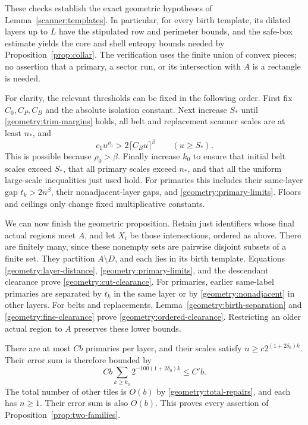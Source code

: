 These checks establish the exact geometric hypotheses of
Lemma~\ref{scanner:templates}.  In particular, for every birth template,
its dilated layers up to $L$ have the stipulated row and perimeter
bounds, and the safe-box estimate yields the core and shell entropy
bounds needed by Proposition~\ref{prop:collar}.  The verification uses
the finite union of convex pieces; no assertion that a primary, a sector
run, or its intersection with $A$ is a rectangle is needed.

For clarity, the relevant thresholds can be fixed in the following
order.  First fix $C_0,C_P,C_B$ and the absolute isolation constant.
Next increase $S_*$ until \eqref{geometry:trim-margins} holds, all belt and
replacement scanner scales are at least $n_*$, and
\begin{equation}
\label{geometry:fine-clearance}
 c_1u^{\rho_0}>2\lceil C_Bu\rceil^\beta
 \qquad(u\ge S_*).
\end{equation}
This is possible because $\rho_0>\beta$.  Finally increase $k_0$ to
ensure that initial belt scales exceed $S_*$, that all primary scales
exceed $n_*$, and that all the uniform large-scale inequalities just used
hold.  For primaries this includes their same-layer gap
$t_k>2n^\beta$, their nonadjacent-layer gaps, and
\eqref{geometry:primary-limits}.  Floors and ceilings only change fixed
multiplicative constants.

We can now finish the geometric proposition.  Retain just identifiers
whose final actual regions meet $A$, and let $X_i$ be those intersections,
ordered as above.  There are finitely many, since these nonempty sets
are pairwise disjoint subsets of a finite set.  They partition $A\setminus
D$, and each lies in its birth template.  Equations
\eqref{geometry:layer-distance}, \eqref{geometry:primary-limits}, and the
descendant clearance prove \eqref{geometry:cut-clearance}.
For primaries, earlier same-label primaries are separated by $t_k$ in the
same layer or by \eqref{geometry:nonadjacent} in other layers.  For belts
and replacements, Lemma~\ref{geometry:birth-separation} and
\eqref{geometry:fine-clearance} prove
\eqref{geometry:ordered-clearance}.  Restricting an older actual region
to $A$ preserves these lower bounds.

There are at most $Cb$ primaries per layer, and their scales satisfy
$n\ge c2^{(1+2\delta_0)k}$.  Their error sum is therefore bounded by
\[
 Cb\sum_{k\ge k_0}2^{-100(1+2\delta_0)k}\le C'b.
\]
The total number of other tiles is $O(b)$ by
\eqref{geometry:total-repairs}, and each has $n\ge1$.  Their error sum is
also $O(b)$.  This proves every assertion of
Proposition~\ref{prop:two-families}.

